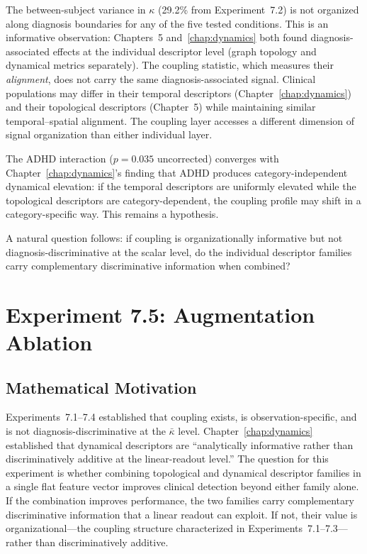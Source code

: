 The between-subject variance in $\kappa$ (29.2\% from Experiment~7.2) is not organized along diagnosis boundaries for any of the five tested conditions. This is an informative observation: Chapters~5 and~\ref{chap:dynamics} both found diagnosis-associated effects at the individual descriptor level (graph topology and dynamical metrics separately). The coupling statistic, which measures their \emph{alignment}, does not carry the same diagnosis-associated signal. Clinical populations may differ in their temporal descriptors (Chapter~\ref{chap:dynamics}) and their topological descriptors (Chapter~5) while maintaining similar temporal--spatial alignment. The coupling layer accesses a different dimension of signal organization than either individual layer.

The ADHD interaction ($p = 0.035$ uncorrected) converges with Chapter~\ref{chap:dynamics}'s finding that ADHD produces category-independent dynamical elevation: if the temporal descriptors are uniformly elevated while the topological descriptors are category-dependent, the coupling profile may shift in a category-specific way. This remains a hypothesis.

A natural question follows: if coupling is organizationally informative but not diagnosis-discriminative at the scalar level, do the individual descriptor families carry complementary discriminative information when combined?


\section{Experiment 7.5: Augmentation Ablation}
\label{sec:exp7_augmentation}

\subsection{Mathematical Motivation}

Experiments~7.1--7.4 established that coupling exists, is observation-specific, and is not diagnosis-discriminative at the $\bar{\kappa}$ level. Chapter~\ref{chap:dynamics} established that dynamical descriptors are ``analytically informative rather than discriminatively additive at the linear-readout level.'' The question for this experiment is whether combining topological and dynamical descriptor families in a single flat feature vector improves clinical detection beyond either family alone. If the combination improves performance, the two families carry complementary discriminative information that a linear readout can exploit. If not, their value is organizational---the coupling structure characterized in Experiments~7.1--7.3---rather than discriminatively additive.

